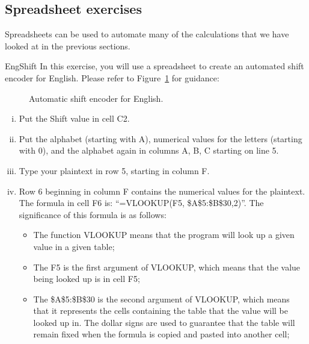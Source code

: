 \subsection{Spreadsheet exercises}
Spreadsheets can be used to automate many of the calculations that we have looked at in the previous sections.

\begin{exercise}{EngShift}
In this exercise, you will use a spreadsheet to create an automated shift encoder for English. Please refer to Figure~\ref{fig:AutoShiftEnc} for guidance:
\begin{figure}[h]
\caption{Automatic shift encoder for English.}
\label{fig:AutoShiftEnc}
\end{figure}
\begin{enumerate}[(i)]
\item
Put the Shift value in cell C2.
\item
Put the alphabet (starting with A), numerical values for the letters (starting with 0), and the alphabet again in columns A, B, C starting on line 5.
\item
Type your plaintext in row 5, starting in column F.
\item
Row 6 beginning in column F contains the numerical values for the plaintext. The formula in cell F6 is: ``=VLOOKUP(F5, \$A\$5:\$B\$30,2)''. The significance of this formula is as follows:
\begin{itemize}
\item
The function VLOOKUP means that the program will look up a given value in a given table;
\item
The F5 is the first argument of VLOOKUP, which means that the value being looked up is in cell F5;
\item
The \$A\$5:\$B\$30 is the second argument of VLOOKUP, which means that it represents the cells containing the table that the value will be looked up in.  The dollar signs are used to guarantee that the table will remain fixed when the formula is copied and pasted into another cell;

\end{itemize}
\end{enumerate}
\end{exercise}

